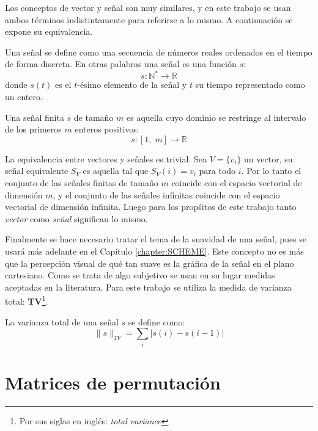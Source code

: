 Los conceptos de vector y señal son muy similares, y en este trabajo se usan ambos t\'erminos indistintamente para referirse a lo mismo. A continuaci\'on se expone su equivalencia.
\begin{definition}
	Una señal se define como una secuencia de n\'umeros reales ordenados en el tiempo de forma discreta. En otras palabras una señal es una función $s$:
	\begin{equation}
		s : \mathbb{N}^\ast \rightarrow \mathbb{R}
	\end{equation}
	donde $s(t)$ es el $t$-\'esimo elemento de la señal y $t$ su tiempo representado como un entero. 
\end{definition}
\begin{definition}
	Una señal finita $s$ de tamaño $m$ es aquella cuyo dominio se restringe al intervalo de los primeros $m$ enteros positivos:
	\begin{equation}
		s : [1,\;m] \rightarrow \mathbb{R}
	\end{equation}
\end{definition}
La equivalencia entre vectores y señales es trivial. Sea $V = \{v_i\}$ un vector, su señal equivalente $S_V$ es aquella tal que $S_V(i) = v_i$ para todo $i$. Por lo tanto el conjunto de las señales finitas de tamaño $m$ coincide con el espacio vectorial de dimensi\'on $m$, y el conjunto de las señales infinitas coincide con el espacio vectorial de dimensi\'on infinita. Luego para los prop\'sitos de este trabajo tanto \textit{vector} como \textit{señal} significan lo mismo.

Finalmente se hace necesario tratar el tema de la suavidad de una señal, pues se usar\'a m\'as adelante en el Cap\'itulo \ref{chapter:SCHEME}. Este concepto no es m\'as que la percepci\'on visual de qu\'e tan suave es la gr\'afica de la señal en el plano cartesiano. Como se trata de algo subjetivo se usan en su lugar medidas aceptadas en la literatura. Para este trabajo se utiliza la medida de varianza total: \textbf{TV}\footnote{Por sus siglas en ingl\'es: \textit{total variance}}.
\begin{definition}\label{def:tv}
	La varianza total de una señal $s$ se define como:
	\begin{equation}
		\|s\|_{TV} = \sum_{i}|s(i) - s(i - 1)|
	\end{equation}
\end{definition}

\section{Matrices de permutaci\'on}\label{sec:permutation_matrices}


